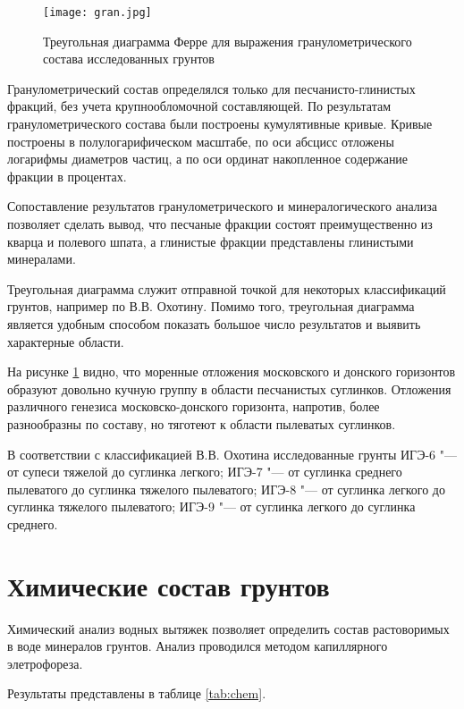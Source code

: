 \begin{figure}[ht]
    \texttt{[image: gran.jpg]}
    
    \caption{Треугольная диаграмма Ферре для выражения гранулометрического состава исследованных грунтов} \label{Fig:Ferre}
\end{figure}

Гранулометрический состав определялся только для песчанисто-глинистых фракций, без учета крупнообломочной составляющей.
По результатам гранулометрического состава были построены кумулятивные кривые.
Кривые построены в полулогарифическом масштабе, 
по оси абсцисс отложены логарифмы диаметров частиц, 
а по оси ординат накопленное содержание фракции в процентах.

Сопоставление результатов гранулометрического и минералогического анализа позволяет сделать вывод, 
что песчаные фракции состоят преимущественно из кварца и полевого шпата, 
а глинистые фракции представлены глинистыми минералами.

Треугольная диаграмма служит отправной точкой для некоторых классификаций грунтов, например по В.\;В. Охотину.
Помимо того, треугольная диаграмма является удобным способом показать большое число результатов и выявить характерные области.

На рисунке \ref{Fig:Ferre} видно, что моренные отложения московского и донского горизонтов образуют довольно кучную группу в области песчанистых суглинков.
Отложения различного генезиса московско-донского горизонта, напротив, более разнообразны по составу, но тяготеют к области 
пылеватых суглинков.

 В соответствии с классификацией В.\;В. Охотина исследованные грунты 
 ИГЭ-6 "--- от супеси тяжелой до суглинка легкого;
 ИГЭ-7 "--- от суглинка среднего пылеватого до суглинка тяжелого пылеватого;
 ИГЭ-8 "--- от суглинка легкого до суглинка тяжелого пылеватого;
 ИГЭ-9 "--- от суглинка легкого до суглинка среднего.

 
\section{Химические состав грунтов}

Химический анализ водных вытяжек позволяет определить состав растоворимых в воде минералов грунтов.
Анализ проводился методом капиллярного элетрофореза. 

Результаты представлены в таблице \ref{tab:chem}.

